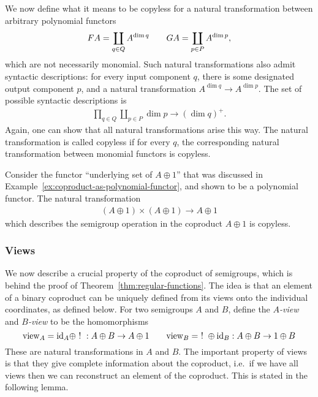 We now define what it means to be copyless for a natural transformation between arbitrary polynomial functors 
\begin{align*}
\functor A = \coprod_{q \in Q} A^{\dim q} \qquad 
\functorg A = \coprod_{p \in P} A^{\dim p},
\end{align*}
which are not necessarily monomial. Such natural transformations also admit syntactic descriptions: for every input component $q$, there is some designated output component $p$, and a natural transformation $A^{\dim q} \to A^{\dim p}$.  The set of possible syntactic descriptions is
\begin{align*}
\prod_{q \in Q} \coprod_{p \in P} \dim p \to (\dim q)^+.
\end{align*}
Again, one can show that all natural transformations arise this way. The natural transformation is called copyless if for every $q$, the corresponding natural transformation between monomial functors is copyless. 


\begin{example}\label{ex:copyless-on-coproducts}
    Consider the functor \enquote{underlying set of $A \oplus 1$} that was discussed in Example~\ref{ex:coproduct-as-polynomial-functor}, and shown to be a polynomial functor. The natural transformation 
    \begin{align*}
    (A \oplus 1)\times (A \oplus 1) \to A \oplus 1
    \end{align*}
    which describes the semigroup operation in the coproduct $A \oplus 1$ is copyless.
\end{example}


\subsubsection{Views}
\label{sec:views}

\newcommand{\combine}{\mathrm{combine}}
\newcommand{\view}{\mathrm{view}}

We now describe a crucial property of the coproduct of semigroups, which is behind the proof of Theorem~\ref{thm:regular-functions}. The idea is that an element of a binary coproduct can be uniquely defined from its views onto the individual coordinates, as defined below. 
For two semigroups $A$ and $B$, define the \emph{$A$-view} and \emph{$B$-view} to be the homomorphisms
\[
    \view_A = \id_A \oplus ~!~ : A \oplus B \to A \oplus 1 \qquad 
    \view_B = ~!~ \oplus \id_B : A \oplus B \to 1 \oplus B
\]
These are natural transformations in $A$ and $B$. The important property of views is that they give complete information about the coproduct, i.e.~if we have all views then we can reconstruct an element of the coproduct.
This is stated in the following lemma. 


